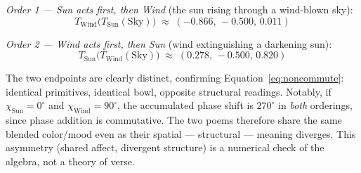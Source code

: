 \documentclass[12pt, a4paper]{article}
\begin{document}
\emph{Order 1 --- Sun acts first, then Wind} (the sun rising through a
wind-blown sky):
\begin{equation}
    T_{\text{Wind}}\big(T_{\text{Sun}}(\text{Sky})\big) \;\approx\; (-0.866,\, -0.500,\, 0.011)
\end{equation}

\emph{Order 2 --- Wind acts first, then Sun} (wind extinguishing a
darkening sun):
\begin{equation}
    T_{\text{Sun}}\big(T_{\text{Wind}}(\text{Sky})\big) \;\approx\; (0.278,\, -0.500,\, 0.820)
\end{equation}

The two endpoints are clearly distinct, confirming
Equation~\eqref{eq:noncommute}: identical primitives, identical
bowl, opposite structural readings. Notably, if $\chi_{\text{Sun}}
= 0^\circ$ and $\chi_{\text{Wind}} = 90^\circ$, the accumulated phase
shift is $270^\circ$ in \emph{both} orderings, since phase addition is
commutative. The two poems therefore share the same blended color/mood
even as their spatial --- structural --- meaning diverges. This
asymmetry (shared affect, divergent structure) is a numerical check of
the algebra, not a theory of verse.
\end{document}
